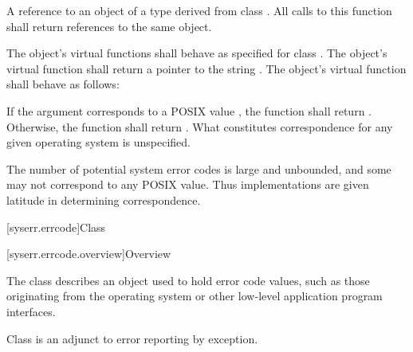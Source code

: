 \begin{itemdescr}
\pnum
\returns A reference to an object of a type derived from class .
All calls to this function shall return references to the same object.

\pnum
\remarks The object's  virtual functions shall behave as specified for
class . The object's  virtual function shall return a
pointer to the string . The object's 
virtual function shall behave as follows:

If the argument  corresponds to a POSIX  value , the
function shall return .
Otherwise, the function shall return . What constitutes correspondence for any given operating
system is unspecified. \begin{note} The number of potential system error codes is large
and unbounded, and some may not correspond to any POSIX  value. Thus
implementations are given latitude in determining correspondence. \end{note}
\end{itemdescr}

[syserr.errcode]{Class }

[syserr.errcode.overview]{Overview}

\pnum
The class  describes an object used to hold error code
values, such as those originating from the operating system or other low-level
application program interfaces. \begin{note} Class  is an
adjunct to error reporting by exception. \end{note}

